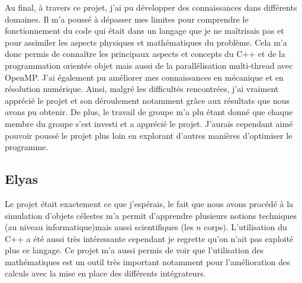 Au final, à travers ce projet, j'ai pu développer des connaissances dans différents domaines. Il m'a poussé à dépasser mes limites pour comprendre le fonctionnement du code qui était dans un langage que je ne maîtrisais pas et pour assimiler les aspects physiques et mathématiques du problème.
Cela m'a donc permis de connaître les principaux aspects et concepts du C++ et de la programmation orientée objet mais aussi de la parallélisation multi-thread avec OpenMP. J'ai également pu améliorer mes connaissances en mécanique et en résolution numérique. 
Ainsi, malgré les difficultés rencontrées, j'ai vraiment apprécié le projet et son déroulement notamment grâce aux résultats que nous avons pu obtenir. De plus, le travail de groupe m'a plu étant donné que chaque membre du groupe s'est investi et a apprécié le projet.
J'aurais cependant aimé pouvoir poussé le projet plus loin en explorant d'autres manières d'optimiser le programme.


\subsection{Elyas}


Le projet était exactement ce que j'espérais, le fait que nous avons procédé à la simulation d'objets célestes m'a permit d'apprendre plusieurs notions techniques (au niveau informatique)mais aussi scientifiques (les $n$ corps). L'utilisation du C++ a été aussi très intéressante cependant je regrette qu'on n'ait pas exploité plus ce langage. Ce projet m'a aussi permis de voir que l'utilisation des mathématiques est un outil très important notamment pour l'amélioration des calculs avec la mise en place des différents intégrateurs.


